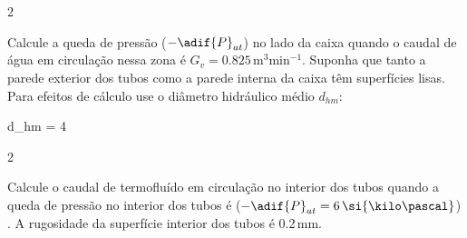 \documentclass[\mainfilename]{subfiles}
\begin{document}
\begin{questionBox}2{} %
    
    Calcule a queda de pressão (\(-\adif{P}_{at}\)) no lado da caixa quando o caudal de água em circulação nessa zona é \(G_v = 0.825\,\si{\metre^3\minute^{-1}}\). Suponha que tanto a parede exterior dos tubos como a parede interna da caixa têm superfícies lisas. Para efeitos de cálculo use o diâmetro hidráulico médio \(d_{hm}\):

    \begin{BM}
        d_{hm}
        = 4\,
    \end{BM}
    
\end{questionBox}

\begin{questionBox}2{} %
    
    Calcule o caudal de termofluído em circulação no interior dos tubos quando a queda de pressão no interior dos tubos é (\(-\adif{P}_{at}= 6\,\si{\kilo\pascal}\)) . A rugosidade da superfície interior dos tubos é 0.2\,\si{\milli\metre}.
    
\end{questionBox}


    
    
    

    
    
\end{document}

